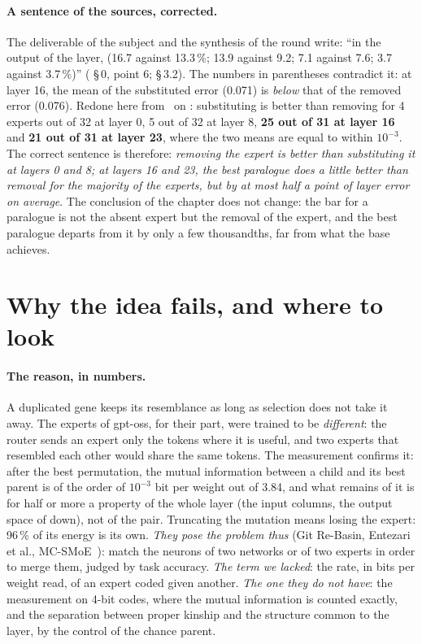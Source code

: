 \paragraph{A sentence of the sources, corrected.} The deliverable of the subject and the synthesis of the round write: ``in the output of the layer,  (16.7 against 13.3\,\%; 13.9 against 9.2; 7.1 against 7.6; 3.7 against 3.7\,\%)'' ( §\,0, point 6;  §\,3.2). The numbers in parentheses contradict it: at layer 16, the mean of the substituted error (0.071) is \emph{below} that of the removed error (0.076). Redone here from  \calc~on \mes: substituting is better than removing for 4 experts out of 32 at layer 0, 5 out of 32 at layer 8, \textbf{25 out of 31 at layer 16} and \textbf{21 out of 31 at layer 23}, where the two means are equal to within $10^{-3}$. The correct sentence is therefore: \emph{removing the expert is better than substituting it at layers 0 and 8; at layers 16 and 23, the best paralogue does a little better than removal for the majority of the experts, but by at most half a point of layer error on average}. The conclusion of the chapter does not change: the bar for a paralogue is not the absent expert but the removal of the expert, and the best paralogue departs from it by only a few thousandths, far from what the base achieves.

\section{Why the idea fails, and where to look}\label{t3dup:sec:pourquoi}

\paragraph{The reason, in numbers.} A duplicated gene keeps its resemblance as long as selection does not take it away. The experts of gpt-oss, for their part, were trained to be \emph{different}: the router sends an expert only the tokens where it is useful, and two experts that resembled each other would share the same tokens. The measurement confirms it: after the best permutation, the mutual information between a child and its best parent is of the order of $10^{-3}$ bit per weight out of 3.84, and what remains of it is for half or more a property of the whole layer (the input columns, the output space of down), not of the pair. Truncating the mutation means losing the expert: 96\,\% of its energy is its own. \emph{They pose the problem thus} (Git Re-Basin, Entezari et al., MC-SMoE~\cite{li2023mcsmoe}): match the neurons of two networks or of two experts in order to merge them, judged by task accuracy. \emph{The term we lacked}: the rate, in bits per weight read, of an expert coded given another. \emph{The one they do not have}: the measurement on 4-bit codes, where the mutual information is counted exactly, and the separation between proper kinship and the structure common to the layer, by the control of the chance parent.


